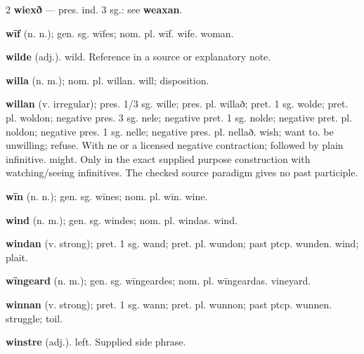 \begin{multicols*}{2}
\textbf{wiexð} — pres. ind. 3 sg.: see \textbf{weaxan}.\par
\textbf{wīf} (n. n.); gen. sg. wīfes; nom. pl. wīf. wife. woman.\par
\textbf{wilde} (adj.). wild. Reference in a source or explanatory note.\par
\textbf{willa} (n. m.); nom. pl. willan. will; disposition.\par
\textbf{willan} (v. irregular); pres. 1/3 sg. wille; pres. pl. willað; pret. 1 sg. wolde; pret. pl. woldon; negative pres. 3 sg. nele; negative pret. 1 sg. nolde; negative pret. pl. noldon; negative pres. 1 sg. nelle; negative pres. pl. nellað. wish; want to. be unwilling; refuse. With ne or a licensed negative contraction; followed by plain infinitive. might. Only in the exact supplied purpose construction with watching/seeing infinitives. The checked source paradigm gives no past participle.\par
\textbf{wīn} (n. n.); gen. sg. wīnes; nom. pl. wīn. wine.\par
\textbf{wind} (n. m.); gen. sg. windes; nom. pl. windas. wind.\par
\textbf{windan} (v. strong); pret. 1 sg. wand; pret. pl. wundon; past ptcp. wunden. wind; plait.\par
\textbf{wīngeard} (n. m.); gen. sg. wīngeardes; nom. pl. wīngeardas. vineyard.\par
\textbf{winnan} (v. strong); pret. 1 sg. wann; pret. pl. wunnon; past ptcp. wunnen. struggle; toil.\par
\textbf{winstre} (adj.). left. Supplied side phrase.\par

\end{multicols*}

